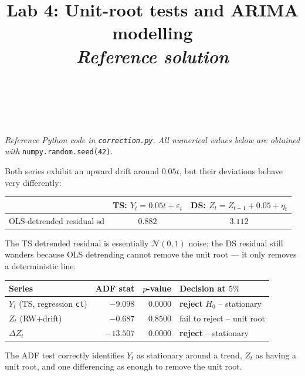 \documentclass[a4paper,11pt]{article}
\title{Lab 4: Unit-root tests and ARIMA modelling\\
\large \emph{Reference solution}}
\author{\auteurNom\\\auteurEmail\\\auteurInstitution}
\date{\anneeUniversitaire}
\begin{document}
\maketitle

\noindent\emph{Reference Python code in \texttt{correction.py}.
All numerical values below are obtained with}
\texttt{numpy.random.seed(42)}.

\setcounter{excounter}{0}

\begin{exercise}[TS vs.\ DS by simulation]\end{exercise}

\begin{solution}
Both series exhibit an upward drift around $0.05 t$, but their
deviations behave very differently:
\begin{center}
\begin{tabular}{lcc}
\toprule
                          & TS: $Y_t = 0.05t + \varepsilon_t$ & DS: $Z_t = Z_{t-1} + 0.05 + \eta_t$ \\
\midrule
OLS-detrended residual sd & $0.882$ & $3.112$ \\
\bottomrule
\end{tabular}
\end{center}
The TS detrended residual is essentially $\mathcal N(0,1)$ noise; the
DS residual still wanders because OLS detrending cannot remove the
unit root --- it only removes a deterministic line.
\end{solution}

\begin{exercise}\end{exercise}

\begin{solution}
\begin{center}
\begin{tabular}{lrrl}
\toprule
Series                             & ADF stat & $p$-value & Decision at $5\%$ \\
\midrule
$Y_t$ (TS, regression \texttt{ct}) & $-9.098$ & $0.0000$  & \textbf{reject} $H_0$ -- stationary \\
$Z_t$ (RW+drift)                   & $-0.687$ & $0.8500$  & fail to reject -- unit root \\
$\Delta Z_t$                       & $-13.507$ & $0.0000$ & \textbf{reject} -- stationary \\
\bottomrule
\end{tabular}
\end{center}

The ADF test correctly identifies $Y_t$ as stationary around a trend,
$Z_t$ as having a unit root, and one differencing as enough to remove
the unit root.
\end{solution}
\end{document}
